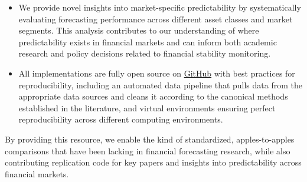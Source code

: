\documentclass{article}
\begin{document}
\begin{itemize}
    \item We provide novel insights into market-specific predictability by systematically evaluating forecasting performance across different asset classes and market segments. This analysis contributes to our understanding of where predictability exists in financial markets and can inform both academic research and policy decisions related to financial stability monitoring.
    
    \item All implementations are fully open source on \href{https://github.com/jmbejara/ftsfr}{GitHub} with best practices for reproducibility, including an automated data pipeline that pulls data from the appropriate data sources and cleans it according to the canonical methods established in the literature, and virtual environments ensuring perfect reproducibility across different computing environments.
\end{itemize}

By providing this resource, we enable the kind of standardized, apples-to-apples comparisons that have been lacking in financial forecasting research, while also contributing replication code for key papers and insights into predictability across financial markets.
\end{document}
